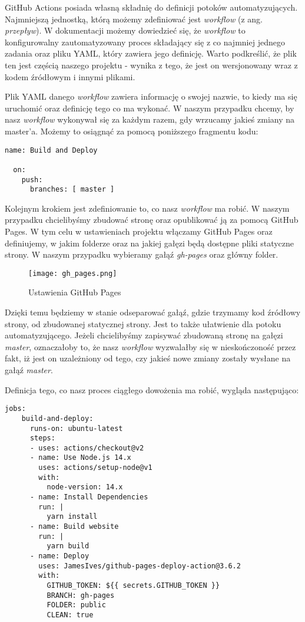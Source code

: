 \par
GitHub Actions posiada własną składnię do definicji potoków automatyzujących. Najmniejszą jednostką, którą możemy zdefiniować jest \textit{workflow} (z ang. \textit{przepływ}). W dokumentacji \cite{GithubActionsDoc} możemy dowiedzieć się, że \textit{workflow} to konfigurowalny zautomatyzowany proces składający się z co najmniej jednego zadania oraz pliku YAML, który zawiera jego definicję. Warto podkreślić, że plik ten jest częścią naszego projektu - wynika z tego, że jest on wersjonowany wraz z kodem źródłowym i innymi plikami.
\par
Plik YAML danego \textit{workflow} zawiera informację o swojej nazwie, to kiedy ma się uruchomić oraz definicję tego co ma wykonać. W naszym przypadku chcemy, by nasz \textit{workflow} wykonywał się za każdym razem, gdy wrzucamy jakieś zmiany na master'a. Możemy to osiągnąć za pomocą poniższego fragmentu kodu:
\begin{lstlisting}[caption={Nazwa oraz definicja wyzwalacza \textit{workflow} budującęgo stronę}]
  name: Build and Deploy

  on:
    push:
      branches: [ master ]
\end{lstlisting}
\par
Kolejnym krokiem jest zdefiniowanie to, co nasz \textit{workflow} ma robić. W naszym przypadku chcielibyśmy zbudować stronę oraz opublikować ją za pomocą GitHub Pages. W tym celu w ustawieniach projektu włączamy GitHub Pages oraz definiujemy, w jakim folderze oraz na jakiej gałęzi będą dostępne pliki statyczne strony. W naszym przypadku wybieramy gałąź \textit{gh-pages} oraz główny folder.
\begin{figure}[htbp]
  \centering
  \texttt{[image: gh\_pages.png]}
  \caption{Ustawienia GitHub Pages}
  \label{fig:gh_pages}
\end{figure}
Dzięki temu będziemy w stanie odseparować gałąź, gdzie trzymamy kod źródłowy strony, od zbudowanej statycznej strony. Jest to także ułatwienie dla potoku automatyzującego. Jeżeli chcielibyśmy zapisywać zbudowaną stronę na gałęzi \textit{master}, oznaczałoby to, że nasz \textit{workflow} wyzwalałby się w nieskończoność przez fakt, iż jest on uzależniony od tego, czy jakieś nowe zmiany zostały wysłane na gałąź \textit{master}.
\par
Definicja tego, co nasz proces ciągłego dowożenia ma robić, wygląda następująco:
\begin{lstlisting}[caption={Definicja zadań \textit{workflow}'a budującego stronę}]
  jobs:
    build-and-deploy:
      runs-on: ubuntu-latest
      steps:
      - uses: actions/checkout@v2
      - name: Use Node.js 14.x
        uses: actions/setup-node@v1
        with:
          node-version: 14.x
      - name: Install Dependencies
        run: |
          yarn install
      - name: Build website
        run: |
          yarn build
      - name: Deploy
        uses: JamesIves/github-pages-deploy-action@3.6.2
        with:
          GITHUB_TOKEN: ${{ secrets.GITHUB_TOKEN }}
          BRANCH: gh-pages
          FOLDER: public
          CLEAN: true
\end{lstlisting}

